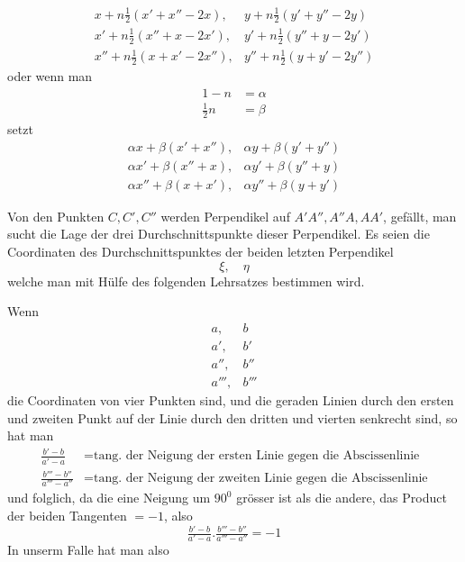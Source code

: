 %
\[
\begin{array}{ll}
x+n\tfrac12(x'+x''-2x),&y+n\tfrac12(y'+y''-2y)\\
x'+n\tfrac12(x''+x-2x'),&y'+n\tfrac12(y''+y-2y')\\
x''+n\tfrac12(x+x'-2x''),&y''+n\tfrac12(y+y'-2y'')
\end{array}
\]
oder wenn man
\[
\begin{aligned}1-n&=\alpha\\\tfrac12n&=\beta\end{aligned}
\]
setzt
\[
\begin{array}{ll}
\alpha x+\beta(x'+x''),&\alpha y+\beta(y'+y'')\\
\alpha x'+\beta(x''+x),&\alpha y'+\beta(y''+y)\\
\alpha x''+\beta(x+x'),&\alpha y''+\beta(y+y')
\end{array}
\]
\par
Von den Punkten \(C,C',C''\) werden Perpendikel auf \(A'A'',A''A,AA'\), gefällt, man sucht die Lage der drei Durchschnittspunkte dieser Perpendikel. Es seien die Coordinaten des Durchschnittspunktes der beiden letzten Perpendikel
\[
\xi,\quad\eta
\]
welche man mit Hülfe des folgenden Lehrsatzes bestimmen wird.

Wenn
\[
\begin{array}{ll}
a,&b\\a',&b'\\a'',&b''\\a''',&b'''
\end{array}
\]
die Coordinaten von vier Punkten sind, und die geraden Linien durch den ersten und zweiten Punkt auf der Linie durch den dritten und vierten senkrecht sind, so hat man
\[
\begin{aligned}
\tfrac{b'-b}{a'-a}&=\text{tang. der Neigung der ersten Linie gegen die Abscissenlinie}\\
\tfrac{b'''-b''}{a'''-a''}&=\text{tang. der Neigung der zweiten Linie gegen die Abscissenlinie}
\end{aligned}
\]
und folglich, da die eine Neigung um \(90^0\) grösser ist als die andere, das Product der beiden Tangenten \(=-1\), also
\[
\tfrac{b'-b}{a'-a}.\tfrac{b'''-b''}{a'''-a''}=-1
\]
In unserm Falle hat man also
